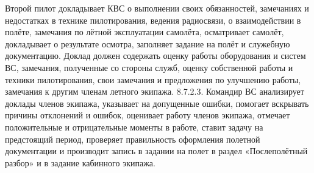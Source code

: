 Второй пилот докладывает КВС о выполнении своих обязанностей, замечаниях и недостатках в технике пилотирования, ведения радиосвязи, о взаимодействии в полёте, замечания по лётной эксплуатации самолёта, осматривает самолёт, докладывает о результате осмотра, заполняет задание на полёт и служебную документацию.
Доклад должен содержать оценку работы оборудования и систем ВС, замечания, полученные со стороны служб, оценку собственной работы и техники пилотирования, свои замечания и предложения по улучшению работы, замечания к другим членам летного экипажа.
8.7.2.3. Командир ВС анализирует доклады членов экипажа, указывает на допущенные ошибки, помогает вскрывать причины отклонений и ошибок, оценивает работу членов экипажа, отмечает положительные и отрицательные моменты в работе, ставит задачу на предстоящий период, проверяет правильность оформления полетной документации и производит запись в задании на полет в раздел «Послеполётный разбор» и в задание кабинного экипажа.
